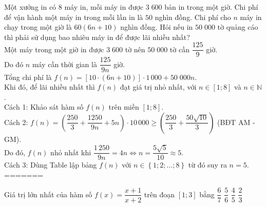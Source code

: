 \begin{ex}%
 Một xưởng in có $8$ máy in, mỗi máy in được $3\;600$ bản in trong một giờ. Chi phí để vận hành một máy in trong mỗi lần in là $50$ nghìn đồng. Chi phí cho $n$ máy in chạy trong một giờ là $60(6n+10)$ nghìn đồng. Hỏi nếu in $50\;000$ tờ quảng cáo thì phải sử dụng bao nhiêu máy in để được lãi nhiều nhất?	\\
 \loigiai
 {Một máy trong một giờ in được $3\;600$ tờ nên $50\;000$ tờ cần $\dfrac{125}{9}$ giờ.\\
 Do đó $n$ máy cần thời gian là $\dfrac{125}{9n}$ giờ.\\
 Tổng chi phí là $f(n)=\left[10\cdot \left(6n+10\right)\right]\cdot 1\,000+50\;000n$.\\
 Khi đó, để lãi nhiều nhất thì $f(n)$ đạt giá trị nhỏ nhất, với $n\in \left[1;8\right]$ và $n\in \mathbb{N}$.\\
 Cách 1: Khảo sát hàm số $f(n)$ trên miền $[1;8]$.\\
 Cách 2: $f(n)=\left(\dfrac{250}{3}+\dfrac{1250}{9n}+5n\right)\cdot 10\,000\geq \left(\dfrac{250}{3}+\dfrac{50\sqrt{10}}{3}\right)$ (BĐT AM - GM).\\
 Do đó, $f(n)$ nhỏ nhất khi $\dfrac{1\,250}{9n}=4n\Leftrightarrow n =\dfrac{5\sqrt{5}}{10}\approx 5$.\\
 Cách 3: Dùng Table lập bảng $f(n)$ với $n\in \left\{1; 2; \ldots ; 8\right\}$ từ đó suy ra $n=5$.
 }
=======
\boxde
\BTTN
\begin{ex}%
 Giá trị lớn nhất của hàm số $f(x)=\dfrac{x+1}{x+2}$ trên đoạn $[1;3]$ bằng
 \choice
 {$\dfrac{6}{7}$}
 {$\dfrac{5}{6}$}
 {\True $\dfrac{4}{5}$}
 {$\dfrac{2}{3}$}
\end{ex}
\begin{ex}

\end{ex}
\end{ex}

